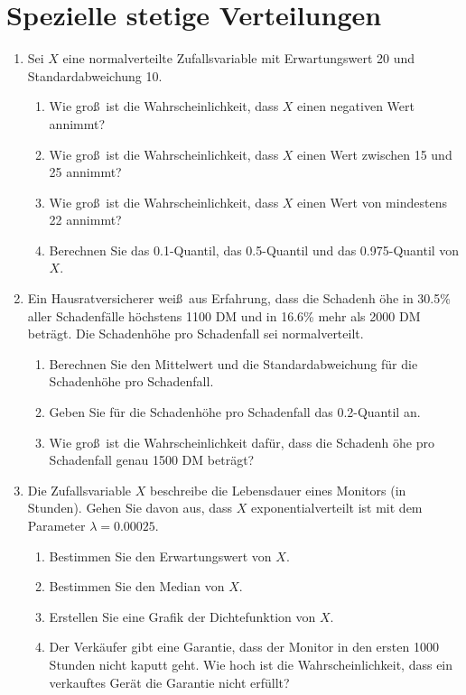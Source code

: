 \section[Stetige Verteilungen]{Spezielle stetige Verteilungen}

\begin{enumerate}
\item Sei $X$ eine normalverteilte Zufallsvariable mit
Erwartungswert 20 und Standardabweichung 10. 
\begin{enumerate}
\item Wie gro\ss\ ist die Wahrscheinlichkeit, dass $X$ einen negativen Wert
annimmt?
\item Wie gro\ss\ ist die Wahrscheinlichkeit, dass $X$ einen Wert zwischen
15 und 25 annimmt?
\item Wie gro\ss\ ist die Wahrscheinlichkeit, dass $X$ einen Wert von
mindestens 22 annimmt?
\item Berechnen Sie das 0.1-Quantil, das 0.5-Quantil und das 0.975-Quantil
von $X$.
\end{enumerate}

\item Ein Hausratversicherer wei\ss\ aus Erfahrung, dass die Schadenh%
\"{o}he in 30.5\% aller Schadenf\"{a}lle h\"{o}chstens 1100 DM und in 16.6\%
mehr als 2000 DM betr\"{a}gt. Die Schadenh\"{o}he pro Schadenfall sei
normalverteilt.
\begin{enumerate}
\item Berechnen Sie den Mittelwert und die Standardabweichung f\"{u}r die
Schadenh\"{o}he pro Schadenfall.
\item Geben Sie f\"{u}r die Schadenh\"{o}he pro Schadenfall das 0.2-Quantil
an.
\item Wie gro\ss\ ist die Wahrscheinlichkeit daf\"{u}r, dass die Schadenh%
\"{o}he pro Schadenfall genau 1500 DM betr\"{a}gt?
\end{enumerate}

\item Die Zufallsvariable $X$ beschreibe die Lebensdauer eines
Monitors (in Stunden). Gehen Sie davon aus, dass $X$
exponentialverteilt ist mit dem Parameter $\lambda =0.00025$.
\begin{enumerate}
\item Bestimmen Sie den Erwartungswert von $X.$
\item Bestimmen Sie den Median von $X$.
\item Erstellen Sie eine Grafik der Dichtefunktion von $X$.
\item Der Verk\"{a}ufer gibt eine Garantie, dass der Monitor in den ersten
1000 Stunden nicht kaputt geht. Wie hoch ist die Wahrscheinlichkeit, dass
ein verkauftes Ger\"{a}t die Garantie nicht erf\"{u}llt?
\end{enumerate}


\end{enumerate}
